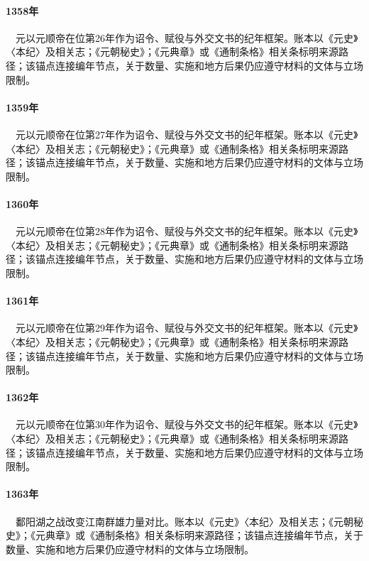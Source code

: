 \paragraph{1358年}　元以元顺帝在位第26年作为诏令、赋役与外交文书的纪年框架。账本以《元史》〈本纪〉及相关志；《元朝秘史》；《元典章》或《通制条格》相关条标明来源路径；该锚点连接编年节点，关于数量、实施和地方后果仍应遵守材料的文体与立场限制。

\paragraph{1359年}　元以元顺帝在位第27年作为诏令、赋役与外交文书的纪年框架。账本以《元史》〈本纪〉及相关志；《元朝秘史》；《元典章》或《通制条格》相关条标明来源路径；该锚点连接编年节点，关于数量、实施和地方后果仍应遵守材料的文体与立场限制。

\paragraph{1360年}　元以元顺帝在位第28年作为诏令、赋役与外交文书的纪年框架。账本以《元史》〈本纪〉及相关志；《元朝秘史》；《元典章》或《通制条格》相关条标明来源路径；该锚点连接编年节点，关于数量、实施和地方后果仍应遵守材料的文体与立场限制。

\paragraph{1361年}　元以元顺帝在位第29年作为诏令、赋役与外交文书的纪年框架。账本以《元史》〈本纪〉及相关志；《元朝秘史》；《元典章》或《通制条格》相关条标明来源路径；该锚点连接编年节点，关于数量、实施和地方后果仍应遵守材料的文体与立场限制。

\paragraph{1362年}　元以元顺帝在位第30年作为诏令、赋役与外交文书的纪年框架。账本以《元史》〈本纪〉及相关志；《元朝秘史》；《元典章》或《通制条格》相关条标明来源路径；该锚点连接编年节点，关于数量、实施和地方后果仍应遵守材料的文体与立场限制。

\paragraph{1363年}　鄱阳湖之战改变江南群雄力量对比。账本以《元史》〈本纪〉及相关志；《元朝秘史》；《元典章》或《通制条格》相关条标明来源路径；该锚点连接编年节点，关于数量、实施和地方后果仍应遵守材料的文体与立场限制。

